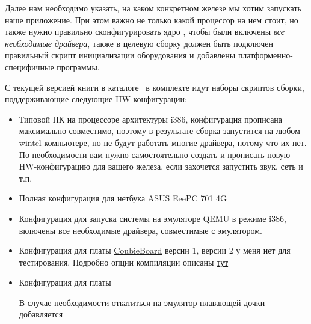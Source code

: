 
Далее нам необходимо указать, на каком конкретном железе мы хотим запускать наше
приложение. При этом важно не только какой процессор на нем стоит, но также
нужно правильно сконфигурировать ядро \linux, чтобы были включены \emph{все
необходимые драйвера}, также в целевую сборку должен быть подключен правильный
скрипт инициализации оборудования и добавлены платформенно-специфичные
программы.



С текущей версией книги в каталоге \ в комплекте идут наборы
скриптов сборки, поддерживающие следующие HW-конфигурации:

\begin{itemize}
  \item {} Типовой ПК на процессоре архитектуры i386, конфигурация
  прописана максимально совместимо, поэтому в результате сборка запустится на
  любом wintel компьютере, но не будут работать многие драйвера, потому что их
  нет. По необходимости вам нужно самостоятельно создать и прописать новую
  HW-конфигурацию для вашего железа, если захочется запустить звук, сеть и т.п.


  \item {}
  Полная конфигурация для нетбука ASUS EeePC 701 4G


  \item {}
  Конфигурация для запуска системы на эмуляторе QEMU в режиме i386, включены
  все необходимые драйвера, совместимые с эмулятором.

  \item {}
  Конфигурация для платы
  \href{http://linux-sunxi.org/Cubietech\_Cubieboard}{CoubieBoard} версии 1,
  версии 2 у меня нет для тестирования.
  Подробно опции компиляции описаны \href{http://habrahabr.ru/post/146877/}{тут}


  \item {}
  Конфигурация для платы \raspi



В случае необходимости откатиться на эмулятор плавающей дочки добавляется


\end{itemize}

